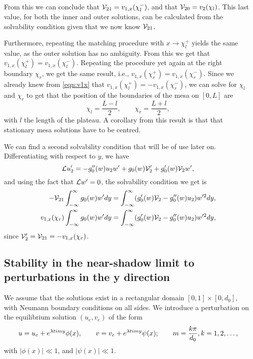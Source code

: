 From this we can conclude that $\mathcal{V}_{21} = v_{1,x}(\chi_l^-)$, and that $\mathcal{V}_{20} = v_2(\chi_l)$. This last value, for both the inner and outer solutions, can be calculated from the solvability condition given that we now know $\mathcal{V}_{21}$. 

Furthermore, repeating the matching procedure with $x\rightarrow \chi_l^+$ yields the same value, as the outer solution has no ambiguity. From this we get that $v_{1,x}(\chi_l^+) = v_{1,x}(\chi_l^-)$. Repeating the procedure yet again at the right boundary $\chi_r$, we get the same result, i.e., $v_{1,x}(\chi_r^+) = v_{1,x}(\chi_r^-)$. Since we already knew from \eqref{eqn:v1x} that $v_{1,x}(\chi_l^+) = - v_{1,x}(\chi_r^-)$, we can solve for $\chi_l$ and $\chi_r$ to get that the position of the boundaries of the mesa on $[0,L]$ are
% 
$$
  \chi_l = \frac{L-l}{2}, \qquad \chi_r = \frac{L+l}{2},
$$
% 
with $l$ the length of the plateau. A corollary from this result is that that stationary mesa solutions have to be centred.

We can find a second solvability condition that will be of use later on. Differentiating with respect to $y$, we have
% 
\begin{equation*}
  \mathcal{L} u_2' = -g_0''(w)u_2w' + g_0(w)\mathcal{V}_2' + g_0'(w)\mathcal{V}_2w',
\end{equation*}
% 
and using the fact that $\mathcal{L} w'=0$, the solvability condition we get is
% 
\begin{equation}
\label{eqn:solva1}
\begin{split}
\begin{aligned}
  -\mathcal{V}_{21}\int_{-\infty}^{\infty}g_0(w)w'dy = \int_{-\infty}^{\infty}(g_0'(w)\mathcal{V}_2 - g_0''(w)u_2)w'^2dy,\\
  v_{1,x}(\chi_r)\int_{-\infty}^{\infty}g_0(w)w'dy = \int_{-\infty}^{\infty}(g_0'(w)\mathcal{V}_2 - g_0''(w)u_2)w'^2dy,
\end{aligned}
\end{split}
\end{equation}
% 
since $\mathcal{V}_2' = \mathcal{V}_{21} = -v_{1,x}(\chi_r)$.


\subsection{\label{section:stability}Stability in the near-shadow limit to perturbations in the y direction}

We assume that the solutions exist in a rectangular domain $[0,1]\times[0,d_0]$, with Neumann boundary conditions on all sides. We introduce a perturbation on the equilibrium solution $(u_e,v_e)$ of the form
% 
\begin{equation*}
  u = u_e + e^{\lambda timy}\phi(x),\qquad v = v_e + e^{\lambda timy}\psi(x); \qquad m = \frac{k\pi}{d_0},k=1,2,\ldots,
\end{equation*}
%
with $|\phi(x)|\ll1$, and $|\psi(x)|\ll1$.

